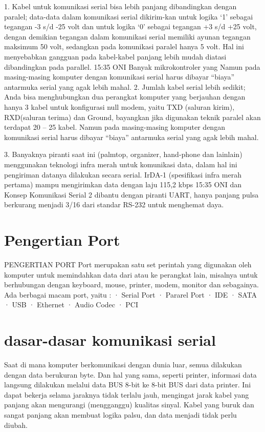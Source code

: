 {{1. Kabel untuk komunikasi serial bisa lebih panjang dibandingkan dengan paralel; data-data dalam komunikasi serial dikirim-kan untuk logika ‘1’ sebagai tegangan -3 s/d -25 volt dan untuk logika ‘0’ sebagai tegangan +3 s/d +25 volt, dengan demikian tegangan dalam komunikasi serial memiliki ayunan tegangan maksimum 50 volt, sedangkan pada komunikasi paralel hanya 5 volt. Hal ini menyebabkan gangguan pada kabel-kabel panjang lebih mudah diatasi dibandingkan pada parallel.
15:35 ONI Banyak mikrokontroler yang Namun pada masing-masing komputer dengan komunikasi serial harus dibayar “biaya” antarmuka serial yang agak lebih mahal.
2. Jumlah kabel serial lebih sedikit; Anda bisa menghubungkan dua perangkat komputer yang berjauhan dengan hanya 3 kabel untuk konfigurasi null modem, yaitu TXD (saluran kirim), RXD(saluran terima) dan Ground, bayangkan jika digunakan teknik paralel akan terdapat 20 – 25 kabel. Namun pada masing-masing komputer dengan komunikasi serial harus dibayar “biaya” antarmuka serial yang agak lebih mahal.

3. Banyaknya piranti saat ini (palmtop, organizer, hand-phone dan lainlain) menggunakan teknologi infra merah untuk komunikasi data, dalam hal ini pengiriman datanya dilakukan secara serial. IrDA-1 (spesifikasi infra merah pertama) mampu mengirimkan data dengan laju 115,2 kbps
15:35 ONI dan Konsep Komunikasi Serial 2 dibantu dengan piranti UART, hanya panjang pulsa berkurang menjadi 3/16 dari standar RS-232 untuk menghemat daya.









\section {Pengertian Port}
PENGERTIAN  PORT
Port merupakan satu set perintah yang digunakan oleh komputer untuk memindahkan data dari atau ke perangkat lain, misalnya untuk berhubungan dengan keyboard, mouse, printer, modem, monitor dan sebagainya. Ada berbagai macam port, yaitu :
·         Serial Port
·         Pararel Port
·         IDE
·         SATA
·         USB
·         Ethernet
·         Audio Codec
·         PCI


\section {dasar-dasar komunikasi serial}
Saat di mana komputer berkomunikasi dengan dunia luar, semua dilakukan dengan data berukuran byte. Dan hal yang sama, seperti printer, informasi data langsung dilakukan melalui data BUS 8-bit ke 8-bit BUS dari data printer. Ini dapat bekerja selama jaraknya tidak terlalu jauh, mengingat jarak kabel yang panjang akan mengurangi (mengganggu) kualitas sinyal. Kabel yang buruk dan sangat panjang akan membuat logika palsu, dan data menjadi tidak perlu diubah.

}}
